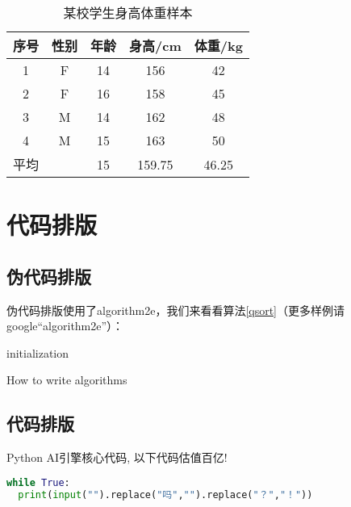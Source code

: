 \documentclass[forprint]{YAUthesis}
\begin{document}
\begin{table}[ht]
\centering
\caption{某校学生身高体重样本}
\label{tab:1}
    \begin{tabular}{ccccc}
    \toprule
    序号&性别&年龄&身高/cm&体重/kg\\
    \midrule
    1&F&14&156&42\\
    2&F&16&158&45\\
    3&M&14&162&48\\
    4&M&15&163&50\\
    \cmidrule{3-5} %
    平均& &15&159.75&46.25\\
    \bottomrule
    \end{tabular}
\end{table}

\section{代码排版}

\subsection{伪代码排版}

伪代码排版使用了algorithm2e，我们来看看算法\ref{qsort}（更多样例请google``algorithm2e''）：

\begin{algorithm}[H]\label{qsort}
    \SetAlgoLined
    initialization\;
    \caption{How to write algorithms}
\end{algorithm}

\subsection{代码排版}

Python AI引擎核心代码, 以下代码估值百亿! 
\begin{lstlisting}[language=python, caption={一段估值百亿的AI核心代码ai.py}, label=ai]
  while True:
  print(input("").replace("吗","").replace("？","！"))
\end{lstlisting}

\end{document}
